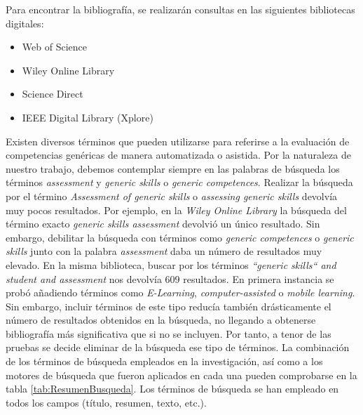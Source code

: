 
\label{sec:MotoresBusqueda}
Para encontrar la bibliografía, se realizarán consultas en las siguientes bibliotecas digitales: 
\begin{itemize}
\item Web of Science
\item Wiley Online Library
\item Science Direct
\item IEEE Digital Library (Xplore)
\end{itemize}

\label{sec:TerminosBusqueda}
Existen diversos términos que pueden utilizarse para referirse a la evaluación de competencias genéricas de manera automatizada o asistida. Por la naturaleza de nuestro trabajo, debemos contemplar siempre en las palabras de búsqueda los términos \emph{assessment} y \emph{generic skills} o \emph{generic competences}. Realizar la búsqueda por el término \emph{Assessment of generic skills} o \emph{assessing generic skills} devolvía muy pocos resultados. Por ejemplo, en la \emph{Wiley Online Library} la búsqueda del término exacto \emph{generic skills assessment} devolvió un único resultado. Sin embargo, debilitar la búsqueda con términos como \emph{generic competences} o \emph{generic skills} junto con la palabra \emph{assessment} daba un número de resultados muy elevado. En la misma biblioteca, buscar por los términos \emph{``generic skills`` and student and assessment} nos devolvía 609 resultados. En primera instancia se probó añadiendo términos como  \emph{E-Learning}, \emph{computer-assisted} o \emph{mobile learning}. Sin embargo, incluir términos de este tipo reducía también drásticamente el número de resultados obtenidos en la búsqueda, no llegando a obtenerse bibliografía más significativa que si no se incluyen. Por tanto, a tenor de las pruebas se decide eliminar de la búsqueda ese tipo de términos. La combinación de los términos de búsqueda empleados en la investigación, así como a los motores de búsqueda que fueron aplicados en cada una pueden comprobarse en la tabla \ref{tab:ResumenBusqueda}. Los términos de búsqueda se han empleado en todos los campos (título, resumen, texto, etc.).

